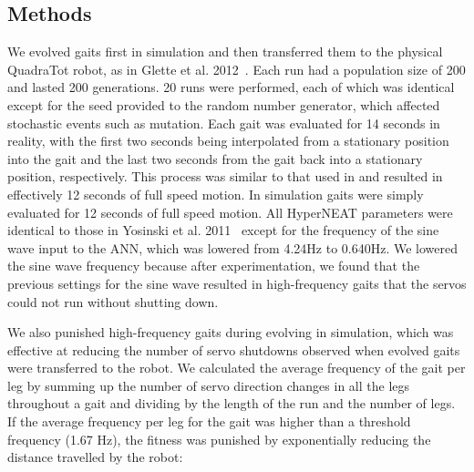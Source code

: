 
\subsection{Methods}

We evolved gaits first in simulation and then transferred them to the physical QuadraTot robot, as in Glette et al. 2012~\cite{glette}. 
Each run had a population size of 200 and lasted 200 generations. 20 runs were performed, each of which was identical except for the seed provided to the random number generator, which affected stochastic events such as mutation. 
Each gait was evaluated for 14 seconds in reality, with the first two
seconds being interpolated from a stationary position into the gait
and the last two seconds from the gait back into a stationary
position, respectively. This process was similar to that used in
\cite{yos:clune} and resulted in effectively 12 seconds of full speed
motion. In simulation gaits were simply evaluated for 12 seconds of
full speed motion. 
All HyperNEAT parameters were identical to those in Yosinski et al. 2011~\cite{yos:clune} except for the frequency of the sine wave input to the ANN, which was lowered from 4.24Hz to 0.640Hz. We lowered the sine wave frequency because after experimentation, we found that the previous settings for the sine wave resulted in high-frequency gaits that the servos could not run without shutting down.


%
%

We also punished high-frequency gaits during evolving in simulation, which was effective at reducing the number of servo shutdowns observed when evolved gaits were transferred to the robot. We calculated the average frequency of the gait per leg by summing up the number of servo direction changes in all the legs throughout a gait and dividing by the length of the run and the number of legs. If the average frequency per leg for the gait was higher than a threshold frequency (1.67 Hz), the fitness was punished by exponentially reducing the distance travelled by the robot:

